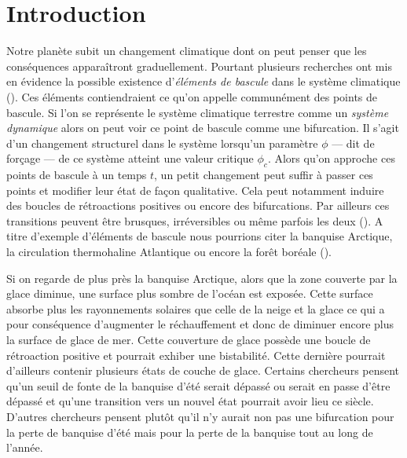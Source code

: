 \section{Introduction}

Notre planète subit un changement climatique dont on peut penser que les conséquences apparaîtront graduellement. Pourtant plusieurs recherches ont mis en évidence la possible existence d'\emph{éléments de bascule} dans le système climatique (\cite{lenton_tipping_2008}). Ces éléments contiendraient ce qu'on appelle communément des points de bascule. Si l'on se représente le système climatique terrestre comme un \emph{système dynamique} alors on peut voir ce point de bascule comme une bifurcation. Il s'agit d'un changement structurel dans le système lorsqu'un paramètre $\phi$ --- dit de forçage --- de ce système atteint une valeur critique $\phi_c$. Alors qu'on approche ces points de bascule à un temps $t$, un petit changement peut suffir à passer ces points et modifier leur état de façon qualitative. Cela peut notamment induire des boucles de rétroactions positives ou encore des bifurcations. Par ailleurs ces transitions peuvent être brusques, irréversibles ou même parfois les deux (\cite{Lenton_2012}). A titre d'exemple d'éléments de bascule nous pourrions citer la banquise Arctique, la circulation thermohaline Atlantique ou encore la forêt boréale (\cite{lenton_tipping_2008}).

Si on regarde de plus près la banquise Arctique, alors que la zone couverte par la glace diminue, une surface plus sombre de l'océan est exposée. Cette surface absorbe plus les rayonnements solaires que celle de la neige et la glace ce qui a pour conséquence d'augmenter le réchauffement et donc de diminuer encore plus la surface de glace de mer. Cette couverture de glace possède une boucle de rétroaction positive et pourrait exhiber une bistabilité. Cette dernière pourrait d'ailleurs contenir plusieurs états de couche de glace. Certains chercheurs pensent qu'un seuil de fonte de la banquise d'été serait dépassé ou serait en passe d'être dépassé et qu'une transition vers un nouvel état pourrait avoir lieu ce siècle. D'autres chercheurs pensent plutôt qu'il n'y aurait non pas une bifurcation pour la perte de banquise d'été mais pour la perte de la banquise tout au long de l'année.

